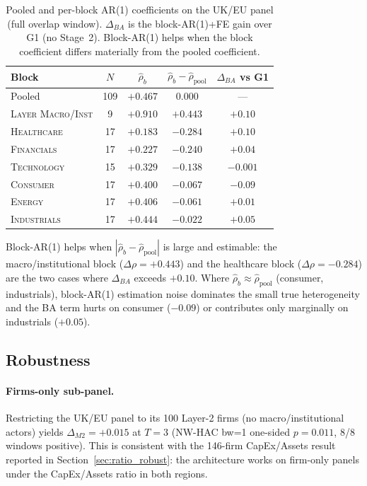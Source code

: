 \documentclass[11pt,a4paper]{article}
\begin{document}
\begin{table}[H]
\centering
\caption{Pooled and per-block AR(1) coefficients on the UK/EU panel (full overlap window). $\Delta_{BA}$ is the block-AR(1)+FE gain over G1 (no Stage~2). Block-AR(1) helps when the block coefficient differs materially from the pooled coefficient.}
\label{tab:uk_eu_rho_b}
\small
\begin{tabular}{lcccc}
\toprule
Block & $N$ & $\hat\rho_b$ & $\hat\rho_b - \hat\rho_{\text{pool}}$ & $\Delta_{BA}$ vs G1 \\
\midrule
Pooled & 109 & $+0.467$ & 0.000 & --- \\
\textsc{Layer Macro/Inst} & 9 & $+0.910$ & $+0.443$ & $+0.10$ \\
\textsc{Healthcare} & 17 & $+0.183$ & $-0.284$ & $+0.10$ \\
\textsc{Financials} & 17 & $+0.227$ & $-0.240$ & $+0.04$ \\
\textsc{Technology} & 15 & $+0.329$ & $-0.138$ & $-0.001$ \\
\textsc{Consumer} & 17 & $+0.400$ & $-0.067$ & $-0.09$ \\
\textsc{Energy} & 17 & $+0.406$ & $-0.061$ & $+0.01$ \\
\textsc{Industrials} & 17 & $+0.444$ & $-0.022$ & $+0.05$ \\
\bottomrule
\end{tabular}
\end{table}

Block-AR(1) helps when $|\hat\rho_b - \hat\rho_{\text{pool}}|$ is large and estimable: the macro/institutional block ($\Delta\rho = +0.443$) and the healthcare block ($\Delta\rho = -0.284$) are the two cases where $\Delta_{BA}$ exceeds $+0.10$. Where $\hat\rho_b \approx \hat\rho_{\text{pool}}$ (consumer, industrials), block-AR(1) estimation noise dominates the small true heterogeneity and the BA term hurts on consumer ($-0.09$) or contributes only marginally on industrials ($+0.05$).

\subsection{Robustness}

\paragraph{Firms-only sub-panel.} Restricting the UK/EU panel to its 100 Layer-2 firms (no macro/institutional actors) yields $\Delta_{M2} = +0.015$ at $T=3$ (NW-HAC bw=1 one-sided $p = 0.011$, 8/8 windows positive). This is consistent with the 146-firm CapEx/Assets result reported in Section~\ref{sec:ratio_robust}: the architecture works on firm-only panels under the CapEx/Assets ratio in both regions.
\end{document}
